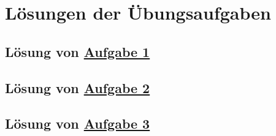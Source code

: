 
\chapter{Lösungen der Übungsaufgaben}

\section{Lösung von 
	\texorpdfstring{\hyperref[aufg:1]{Aufgabe 1}}{}
}\label{loes:1}


\section{Lösung von 
	\texorpdfstring{\hyperref[aufg:2]{Aufgabe 2}}{}
}\label{loes:2}


\section{Lösung von 
	\texorpdfstring{\hyperref[aufg:3]{Aufgabe 3}}{}
}\label{loes:3}

